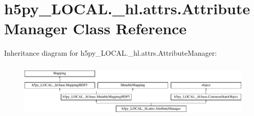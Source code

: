 \hypertarget{classh5py__LOCAL_1_1__hl_1_1attrs_1_1AttributeManager}{}\section{h5py\+\_\+\+L\+O\+C\+A\+L.\+\_\+hl.\+attrs.\+Attribute\+Manager Class Reference}
\label{classh5py__LOCAL_1_1__hl_1_1attrs_1_1AttributeManager}
Inheritance diagram for h5py\+\_\+\+L\+O\+C\+A\+L.\+\_\+hl.\+attrs.\+Attribute\+Manager\+:\begin{figure}[H]
\begin{center}
\leavevmode
\includegraphics[height=2.666667cm]{classh5py__LOCAL_1_1__hl_1_1attrs_1_1AttributeManager}
\end{center}
\end{figure}
